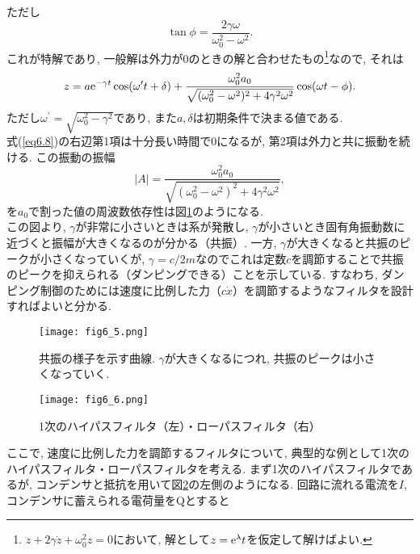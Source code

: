 ただし
\begin{equation}
\tan\phi=\frac{2\gamma\omega}{\omega_0^2-\omega^2}.
\end{equation}
これが特解であり, 一般解は外力が0のときの解と合わせたもの\footnote{$\ddot{z}+2\gamma\dot{z}+\omega_0^2z=0$において, 解として$z={\rm e}^{\lambda}t$を仮定して解けばよい. }なので, それは
\begin{equation}
z=a{\rm e}^{-\gamma t}\cos(\omega^{\prime}t+\delta)+\frac{\omega_0^2a_0}{\sqrt{(\omega_0^2-\omega^2)^2+4\gamma^2\omega^2}}\cos(\omega t-\phi).
\label{eq6.8}
\end{equation}
ただし$\omega^{\prime}=\sqrt{\omega_0^2-\gamma^2}$であり, また$a,\delta$は初期条件で決まる値である. \\
\quad 式(\ref{eq6.8})の右辺第1項は十分長い時間で0になるが, 第2項は外力と共に振動を続ける. この振動の振幅
\begin{equation}
|A|=\frac{\omega_0^2a_0}{\sqrt{(\omega_0^2-\omega^2)^2+4\gamma^2\omega^2}},
\end{equation}
を$a_0$で割った値の周波数依存性は図\ref{fig6.5}のようになる. \\
\quad この図より, $\gamma$が非常に小さいときは系が発散し, $\gamma$が小さいとき固有角振動数に近づくと振幅が大きくなるのが分かる（共振）. 一方, $\gamma$が大きくなると共振のピークが小さくなっていくが, $\gamma=c/2m$なのでこれは定数$c$を調節することで共振のピークを抑えられる（ダンピングできる）ことを示している. すなわち, ダンピング制御のためには速度に比例した力（$c\dot{x}$）を調節するようなフィルタを設計すればよいと分かる. 
\begin{figure}[H]
\begin{center}
\texttt{[image: fig6\_5.png]}
\caption[共振の様子を示す曲線]{共振の様子を示す曲線. $\gamma$が大きくなるにつれ, 共振のピークは小さくなっていく. }
\label{fig6.5}
\end{center}
\end{figure}
\begin{figure}[H]
\begin{center}
\texttt{[image: fig6\_6.png]}
\caption[1次のハイパスフィルタ・ローパスフィルタ]{1次のハイパスフィルタ（左）・ローパスフィルタ（右）}
\label{fig6.6}
\end{center}
\end{figure}
ここで, 速度に比例した力を調節するフィルタについて, 典型的な例として1次のハイパスフィルタ・ローパスフィルタを考える. まず1次のハイパスフィルタであるが, コンデンサと抵抗を用いて図\ref{fig6.6}の左側のようになる. 回路に流れる電流を$I$, コンデンサに蓄えられる電荷量をQとすると
